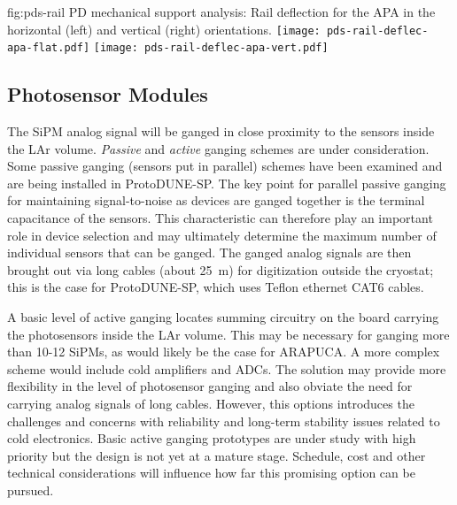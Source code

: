 \begin{dunefigure}{fig:pds-rail}
{PD mechanical support analysis: Rail deflection for the APA in the horizontal (left) and vertical (right) orientations.}
	\texttt{[image: pds-rail-deflec-apa-flat.pdf]} 
	\texttt{[image: pds-rail-deflec-apa-vert.pdf]}\\
\end{dunefigure}



\subsection{Photosensor Modules}
\label{sec:fdsp-pd-assy-psm}

The SiPM analog signal will be ganged in close proximity to the sensors inside the
LAr volume. {\it Passive} and {\it active} ganging schemes are under consideration. Some passive
ganging (sensors put in parallel) schemes have been examined and are being installed in
ProtoDUNE-SP.
The key point for parallel passive ganging for maintaining signal-to-noise as devices are ganged together is the terminal capacitance of the sensors. This characteristic can therefore play an important role in device selection and may ultimately determine  the maximum number of individual sensors that can be ganged. The ganged analog signals are then brought out via long cables (about \SI{25}{m}) for digitization outside the cryostat; this is the case for ProtoDUNE-SP, which uses Teflon ethernet CAT6 cables.

A basic level of active ganging locates summing circuitry on the board carrying the photosensors inside the LAr volume. This may be necessary for ganging more than 10-12 SiPMs, as would likely be the case for ARAPUCA. A more complex scheme would include cold amplifiers and ADCs.
The solution may provide more flexibility in the level of photosensor ganging and also obviate the need for carrying analog signals of long cables.
However, this options introduces the challenges and concerns with reliability and long-term
stability issues related to cold electronics.  Basic active ganging prototypes are under study with high priority 
but the design is not yet at a mature stage. Schedule, cost and other technical
considerations will influence how far this promising option can be pursued.

